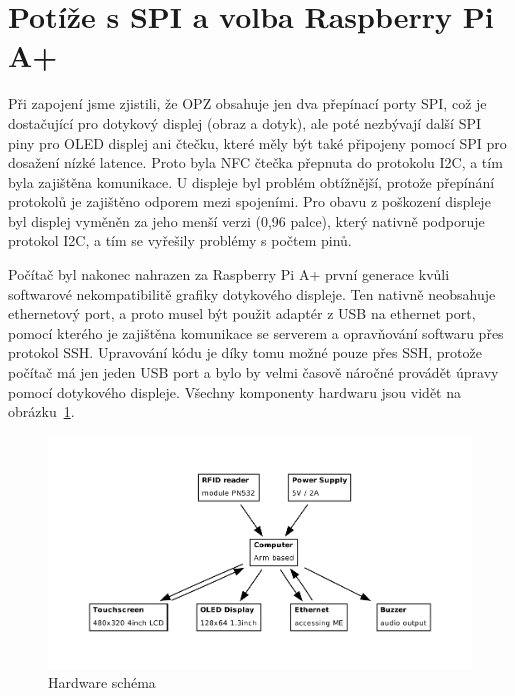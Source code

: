\section{Potíže s SPI a volba Raspberry Pi A+}

Při zapojení jsme zjistili, že OPZ obsahuje jen dva přepínací porty SPI,
což je dostačující pro dotykový displej (obraz a dotyk), ale poté nezbývají
další SPI piny pro OLED displej ani čtečku, které měly být také připojeny pomocí
SPI pro dosažení nízké latence. Proto byla NFC čtečka přepnuta do protokolu I2C,
a tím byla zajištěna komunikace. U displeje byl problém obtížnější, protože 
přepínání protokolů je zajištěno odporem mezi spojeními. Pro obavu z poškození
displeje byl displej vyměněn za jeho menší verzi (0,96 palce), který
nativně podporuje protokol I2C, a tím se vyřešily problémy s počtem pinů.

Počítač byl nakonec nahrazen za Raspberry Pi A+ první generace kvůli softwarové
nekompatibilitě grafiky dotykového displeje. Ten nativně neobsahuje ethernetový port,
a proto musel být použit adaptér z USB na ethernet port, pomocí kterého je zajištěna komunikace
se serverem a opravňování softwaru přes protokol SSH.
Upravování kódu je díky tomu možné pouze přes SSH, protože počítač má jen jeden
USB port a bylo by velmi časově náročné provádět úpravy pomocí dotykového displeje.
Všechny komponenty hardwaru jsou vidět na obrázku~\ref{hardwareGraph}.

\begin{figure} \centering
    \includegraphics[width=145mm]{../img/hardware}
\caption{Hardware schéma}
\label{hardwareGraph}
\end{figure}


